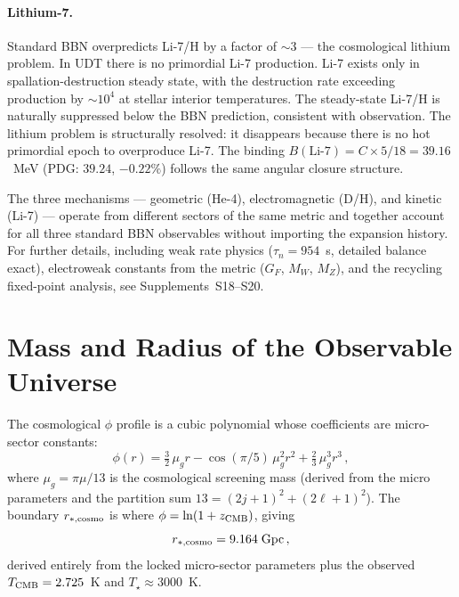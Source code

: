 \documentclass[aps,prd,twocolumn,superscriptaddress,nofootinbib,longbibliography]{revtex4-2}
\newcommand{\mug}{\mu_g}
\begin{document}
\paragraph{Lithium-7.}  Standard BBN overpredicts Li-7/H by a factor
of $\sim 3$ --- the cosmological lithium problem.  In UDT there is no
primordial Li-7 production.  Li-7 exists only in
spallation-destruction steady state, with the destruction rate
exceeding production by $\sim 10^4$ at stellar interior temperatures.
The steady-state Li-7/H is naturally suppressed below the BBN
prediction, consistent with observation.  The lithium problem is
structurally resolved: it disappears because there is no hot
primordial epoch to overproduce Li-7.  The binding
$B(\text{Li-7}) = C \times 5/18 = 39.16$~MeV (PDG: $39.24$,
$-0.22\%$) follows the same angular closure structure.

The three mechanisms --- geometric (He-4), electromagnetic (D/H), and
kinetic (Li-7) --- operate from different sectors of the same metric
and together account for all three standard BBN observables without
importing the expansion history.  For further details, including weak
rate physics ($\tau_n = 954$~s, detailed balance exact), electroweak
constants from the metric ($G_F$, $M_W$, $M_Z$), and the recycling
fixed-point analysis, see Supplements~S18--S20.

\section{Mass and Radius of the Observable Universe}\label{sec:universe}

The cosmological $\phi$ profile is a cubic polynomial whose
coefficients are micro-sector constants:
\begin{equation}
  \phi(r) = \tfrac{3}{2}\,\mug r
  - \cos(\pi/5)\,\mug^2 r^2
  + \tfrac{2}{3}\,\mug^3 r^3\,,
\end{equation}
where $\mug = \pi\mu/13$ is the cosmological screening mass (derived
from the micro parameters and the partition sum
$13 = (2j+1)^2 + (2\ell+1)^2$).  The boundary $r_{*,\rm cosmo}$
is where $\phi = \ln(1 + z_{\rm CMB})$, giving
\begin{equation}
  r_{*,\rm cosmo} = 9.164\;\text{Gpc}\,,
\end{equation}
derived entirely from the locked micro-sector parameters plus the
observed $T_{\rm CMB} = 2.725$~K and $T_\star \approx 3000$~K.
\end{document}
